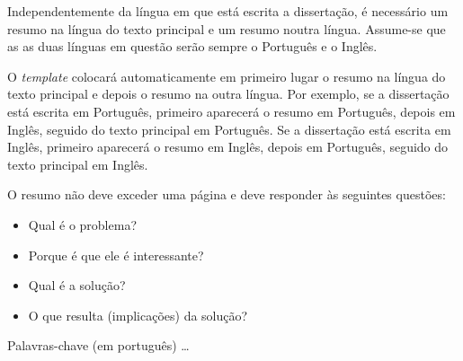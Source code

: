 \abstractPT 

Independentemente da língua em que está escrita a dissertação, é necessário um resumo na língua do texto principal e um resumo noutra língua.  Assume-se que as as duas línguas em questão serão sempre o Português e o Inglês.

O \emph{template} colocará automaticamente em primeiro lugar o resumo na língua do texto principal e depois o resumo na outra língua.  Por exemplo, se a dissertação está escrita em Português, primeiro aparecerá o resumo em Português, depois em Inglês, seguido do texto principal em Português. Se a dissertação está escrita em Inglês, primeiro aparecerá o resumo em Inglês, depois em Português, seguido do texto principal em Inglês.

O resumo não deve exceder uma página e deve responder às seguintes questões:
\begin{itemize}
	\item Qual é o problema?
	\item Porque é que ele é interessante?
	\item Qual é a solução?
	\item O que resulta (implicações) da solução?
\end{itemize}

\begin{keywords}
Palavras-chave (em português) \ldots
\end{keywords}
